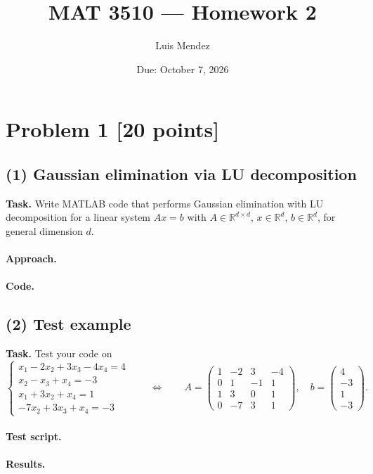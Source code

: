 \documentclass[11pt]{article}
\title{MAT 3510 --- Homework 2}
\author{Luis Mendez}
\date{Due: October 7, 2026}
\begin{document}
\maketitle

\section*{Problem 1 [20 points]}

\subsection*{(1) Gaussian elimination via LU decomposition}

\textbf{Task.} Write MATLAB code that performs Gaussian elimination with LU
decomposition for a linear system $Ax=b$ with $A\in\mathbb{R}^{d\times d}$,
$x\in\mathbb{R}^d$, $b\in\mathbb{R}^d$, for general dimension $d$.

\paragraph{Approach.}

\paragraph{Code.}
%   

\subsection*{(2) Test example}

\textbf{Task.} Test your code on
\[
\begin{cases}
  x_1 - 2x_2 + 3x_3 - 4x_4 = 4\\
  x_2 - x_3 + x_4 = -3\\
  x_1 + 3x_2 + x_4 = 1\\
  -7x_2 + 3x_3 + x_4 = -3
\end{cases}
\qquad\Longleftrightarrow\qquad
A=\begin{pmatrix}
   1 & -2 &  3 & -4\\
   0 &  1 & -1 &  1\\
   1 &  3 &  0 &  1\\
   0 & -7 &  3 &  1
\end{pmatrix},\quad
b=\begin{pmatrix}4\\-3\\1\\-3\end{pmatrix}.
\]

\paragraph{Test script.}

\paragraph{Results.}
\end{document}
